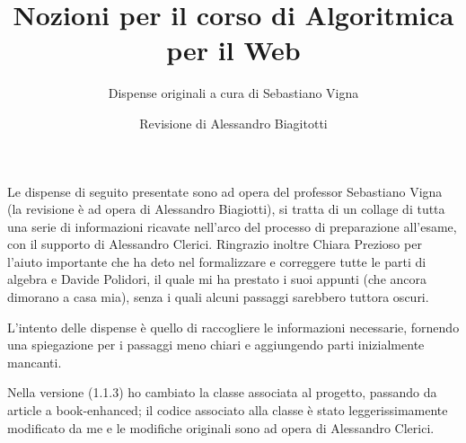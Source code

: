 \documentclass[a4paper]{book-enhanced}
\title{Nozioni per il corso di Algoritmica per il Web}
\subtitle{Dispense originali a cura di Sebastiano Vigna}
\author{Revisione di Alessandro Biagitotti}
\begin{document}
\maketitle
\noindent Le dispense di seguito presentate sono ad opera del professor Sebastiano Vigna (la
revisione è ad opera di Alessandro Biagiotti), si tratta di un collage di tutta una serie di
informazioni ricavate nell'arco del processo di preparazione all'esame, con il supporto di
Alessandro Clerici. Ringrazio inoltre Chiara Prezioso per l'aiuto importante che ha deto nel formalizzare e correggere tutte le parti di algebra e Davide Polidori, il quale mi ha prestato i suoi appunti (che ancora dimorano a casa mia), senza i quali alcuni passaggi sarebbero tuttora oscuri.

L'intento delle dispense è quello di raccogliere le informazioni necessarie, fornendo una spiegazione per i passaggi meno chiari e aggiungendo parti inizialmente mancanti.

Nella versione (1.1.3) ho cambiato la classe associata al progetto, passando da article a book-enhanced; il codice associato alla classe è stato leggerissimamente modificato da me e le modifiche originali sono ad opera di Alessandro Clerici.

\tableofcontents
\clearpage



\end{document}
